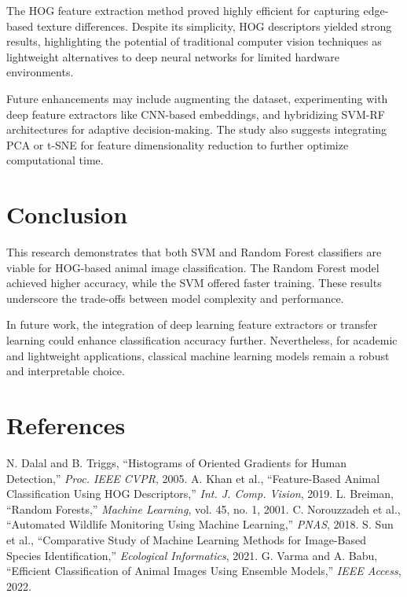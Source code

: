 \documentclass[conference]{IEEEtran}
\begin{document}
The HOG feature extraction method proved highly efficient for capturing edge-based texture differences. Despite its simplicity, HOG descriptors yielded strong results, highlighting the potential of traditional computer vision techniques as lightweight alternatives to deep neural networks for limited hardware environments.  
\vspace{3pt}

Future enhancements may include augmenting the dataset, experimenting with deep feature extractors like CNN-based embeddings, and hybridizing SVM-RF architectures for adaptive decision-making. The study also suggests integrating PCA or t-SNE for feature dimensionality reduction to further optimize computational time.

\section{Conclusion}
This research demonstrates that both SVM and Random Forest classifiers are viable for HOG-based animal image classification. The Random Forest model achieved higher accuracy, while the SVM offered faster training. These results underscore the trade-offs between model complexity and performance.  
\vspace{3pt}

In future work, the integration of deep learning feature extractors or transfer learning could enhance classification accuracy further. Nevertheless, for academic and lightweight applications, classical machine learning models remain a robust and interpretable choice.

\section*{References}
\begin{thebibliography}{00}
 N. Dalal and B. Triggs, ``Histograms of Oriented Gradients for Human Detection,'' \textit{Proc. IEEE CVPR}, 2005.
 A. Khan et al., ``Feature-Based Animal Classification Using HOG Descriptors,'' \textit{Int. J. Comp. Vision}, 2019.
 L. Breiman, ``Random Forests,'' \textit{Machine Learning}, vol. 45, no. 1, 2001.
 C. Norouzzadeh et al., ``Automated Wildlife Monitoring Using Machine Learning,'' \textit{PNAS}, 2018.
 S. Sun et al., ``Comparative Study of Machine Learning Methods for Image-Based Species Identification,'' \textit{Ecological Informatics}, 2021.
 G. Varma and A. Babu, ``Efficient Classification of Animal Images Using Ensemble Models,'' \textit{IEEE Access}, 2022.
\end{thebibliography}
\end{document}
